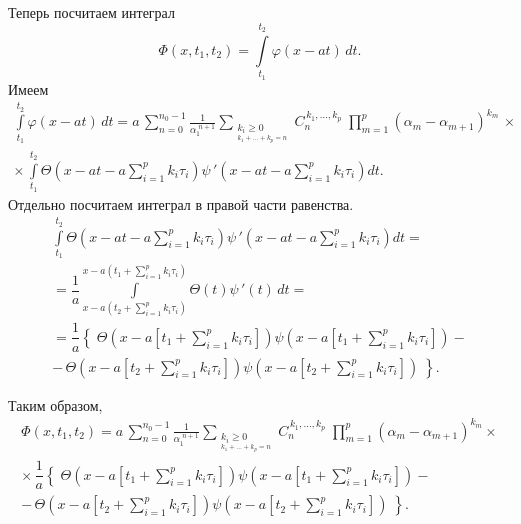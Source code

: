 \documentclass{article}
\renewcommand{\ge}{\geqslant}
\theoremstyle{definition}
\begin{document}
Теперь посчитаем интеграл
\begin{equation} \label{int_phi}
	\varPhi(x, t_1, t_2) = \int\limits_{t_1}^{t_2}\varphi(x - at) \,dt.
\end{equation}
Имеем
\begin{equation*}
\begin{gathered}
	\int\limits_{t_1}^{t_2}\varphi(x - at) \,dt = a\,\sum\limits_{n = 0}^{n_0 - 1} \frac{1}{\alpha_1^{\,\,n + 1}}
	\sum\limits_{\substack{{k_i \ge 0} \\_{k_1 + ... + k_p = n}}}\!\!\!\!C_n^{\,k_1, ..., k_p}\;
	\prod_{m = 1}^{p}(\alpha_m - \alpha_{m + 1})^{k_m} \,\times \\[5mm]
	\times\, \int\limits_{t_1}^{t_2} \Theta\left(x - at - a\sum\limits_{i = 1}^{p}k_i\tau_i\right)
	\psi\,'\left(x - at - a\sum\limits_{i = 1}^{p}k_i\tau_i\right) dt.
\end{gathered}
\end{equation*}
Отдельно посчитаем интеграл в правой части равенства. 
\begin{gather*}
	\int\limits_{t_1}^{t_2} \Theta\left(x - at - a\sum\limits_{i = 1}^{p}k_i\tau_i\right)
	\psi\,'\left(x - at - a\sum\limits_{i = 1}^{p}k_i\tau_i\right) dt = \\[5mm]
	= \dfrac{1}{a} \int\limits_{x - a\left(t_2 + \sum\limits_{i = 1}^{p}k_i\tau_i\right)}
	^{x - a\left(t_1 + \sum\limits_{i = 1}^{p}k_i\tau_i\right)} \Theta(t)\psi\,'(t) \,dt = \\[5mm]
	= \dfrac{1}{a} \left\{\; \Theta\left(x - a\left[t_1 + \sum\limits_{i = 1}^{p}k_i\tau_i\right]\right)
	\psi\left(x - a\left[t_1 + \sum\limits_{i = 1}^{p}k_i\tau_i\right]\right) - \right. \\[5mm] \left.
	-\, \Theta\left(x - a\left[t_2 + \sum\limits_{i = 1}^{p}k_i\tau_i\right]\right)
	\psi\left(x - a\left[t_2 + \sum\limits_{i = 1}^{p}k_i\tau_i\right]\right) \;\right\}.
\end{gather*}


Таким образом,
\begin{equation} \label{int_phi_def}
\begin{gathered} 
	\varPhi(x, t_1, t_2) = a\,\sum\limits_{n = 0}^{n_0 - 1} \frac{1}{\alpha_1^{\,\,n + 1}}
	\sum\limits_{\substack{{k_i \ge 0} \\_{k_1 + ... + k_p = n}}}\!\!\!\!C_n^{\,k_1, ..., k_p}\;
	\prod_{m = 1}^{p}(\alpha_m - \alpha_{m + 1})^{k_m} \times \\[5mm] \times\,
	\dfrac{1}{a} \left\{\; \Theta\left(x - a\left[t_1 + \sum\limits_{i = 1}^{p}k_i\tau_i\right]\right)
	\psi\left(x - a\left[t_1 + \sum\limits_{i = 1}^{p}k_i\tau_i\right]\right) - \right. \\[5mm] \left. -\, 
	\Theta\left(x - a\left[t_2 + \sum\limits_{i = 1}^{p}k_i\tau_i\right]\right)
	\psi\left(x - a\left[t_2 + \sum\limits_{i = 1}^{p}k_i\tau_i\right]\right) \;\right\}.
\end{gathered}
\end{equation}
\end{document}

